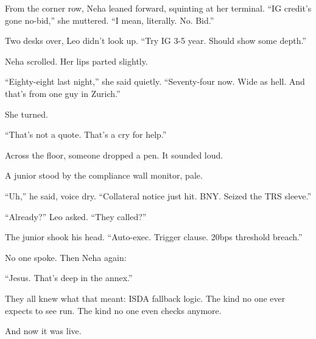 From the corner row, Neha leaned forward, squinting at her terminal.
“IG credit’s gone no-bid,” she muttered. “I mean, literally. No. Bid.”

Two desks over, Leo didn’t look up.
“Try IG 3-5 year. Should show some depth.”

Neha scrolled. Her lips parted slightly.

“Eighty-eight last night,” she said quietly. “Seventy-four now. Wide as hell. And that’s from one guy in Zurich.”

She turned.

“That’s not a quote. That’s a cry for help.”

Across the floor, someone dropped a pen. It sounded loud.

A junior stood by the compliance wall monitor, pale.

“Uh,” he said, voice dry. “Collateral notice just hit. BNY. Seized the TRS sleeve.”

“Already?” Leo asked. “They called?”

The junior shook his head. “Auto-exec. Trigger clause. 20bps threshold breach.”

No one spoke. Then Neha again:

“Jesus. That’s deep in the annex.”

They all knew what that meant:
ISDA fallback logic. The kind no one ever expects to see run.
The kind no one even checks anymore.

And now it was live.

\medskip

